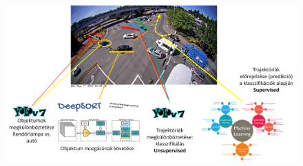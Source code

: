 \documentclass[acmtog, authorversion]{acmart}
\begin{document}
\begin{figure}[ht]
    \centering
    \includegraphics[width=2\columnwidth]{deepsort_yolo_figs/gépilátás_modified.jpg}
\end{figure}
\end{document}
